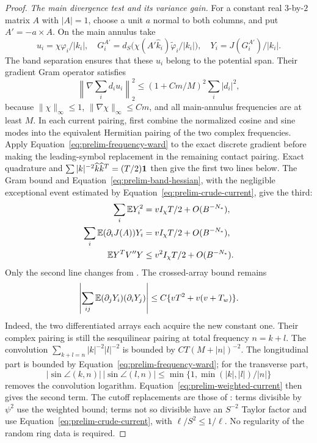 \begin{proof}
\smallskip\noindent
\emph{The main divergence test and its variance gain.}
For a constant real $3$-by-$2$ matrix $A$ with $|A|=1$, choose a unit
$a$ normal to both columns, and put $A'=-a\times A$. On the main
annulus take
\[
 u_i=\chi\varphi_i/|k_i|,\quad
 G_i^{A'}=d_S\bigl(\chi(A'\widehat k_i)
                        \widetilde\varphi_i/|k_i|\bigr),\quad
 Y_i=J(G_i^{A'})/|k_i|.
\]
The band separation ensures that these $u_i$ belong to the potential
span. Their gradient Gram operator satisfies
\[
 \left\|\nabla\sum_i d_i u_i\right\|_2^2
 \le(1+Cm/M)^2\sum_i|d_i|^2,
\]
because $\|\chi\|_\infty\le1$, $\|\nabla\chi\|_\infty\le Cm$, and
all main-annulus frequencies are at least $M$.
In each current pairing, first combine the normalized cosine and sine
modes into the equivalent Hermitian pairing of the two complex
frequencies. Apply Equation~\eqref{eq:prelim-frequency-ward} to the exact
discrete gradient before making the leading-symbol replacement in the
remaining contact pairing. Exact quadrature and
$\sum|k|^{-2}\widehat k\widehat k^T=(T/2)\mathbf 1$ then give the first two
lines below. The Gram bound and
Equation~\eqref{eq:prelim-band-hessian}, with the negligible exceptional
event estimated by Equation~\eqref{eq:prelim-crude-current}, give the
third:
\begin{align*}
 \sum_i\mathbb E Y_i^2&=vI_\chi T/2+O(B^{-N_*}),\\
 \sum_i\mathbb E(\partial_iJ(A))Y_i&=vI_\chi T/2+O(B^{-N_*}),\\
 \mathbb E Y^TV''Y&\le v^2I_\chi T/2+O(B^{-N_*}).
\end{align*}
Only the second line changes from .
The crossed-array bound remains
\[
 \left|\sum_{ij}\mathbb E(\partial_jY_i)(\partial_iY_j)\right|
 \le C\{vT^2+v(v+T_w)\}.
\]
Indeed, the two differentiated arrays each acquire the new constant
one. Their complex pairing is still the sesquilinear pairing at total
frequency $n=k+l$. The convolution
$\sum_{k+l=n}|k|^{-2}|l|^{-2}$ is bounded by
$CT(M+|n|)^{-2}$. The longitudinal part is bounded by
Equation~\eqref{eq:prelim-frequency-ward}; for the transverse part,
\[
 |\sin\angle(k,n)|\,|\sin\angle(l,n)|
 \le\min\{1,\min(|k|,|l|)/|n|\}
\]
removes the convolution logarithm. Equation~\eqref{eq:prelim-weighted-current}
then gives the second term. The cutoff replacements are those of
: terms divisible by $\psi^2$ use the weighted bound;
terms not so divisible have an $S^{-2}$ Taylor factor and use
Equation~\eqref{eq:prelim-crude-current}, with $\ell/S^2\le1/\ell$.
No regularity of the random ring data is required.


\end{proof}
